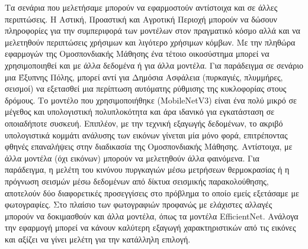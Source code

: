 Τα σενάρια που μελετήσαμε μπορούν να εφαρμοστούν αντίστοιχα και σε άλλες περιπτώσεις. Η Αστική, Προαστική και Αγροτική Περιοχή μπορούν να δώσουν πληροφορίες για την συμπεριφορά των μοντέλων στον πραγματικό κόσμο αλλά και να μελετηθούν περιπτώσεις χρήσιμων και λιγότερο χρήσιμων κόμβων. Με την πληθώρα εφαρμογών της Ομοσπονδιακής Μάθησης ένα τέτοιο οικοσύστημα μπορεί να χρησιμοποιηθεί και με άλλα δεδομένα ή για άλλα μοντέλα. Για παράδειγμα σε σενάριο μια Έξυπνης Πόλης, μπορεί αντί για Δημόσια Ασφάλεια (πυρκαγιές, πλυμμήρες, σεισμοί) να εξετασθεί μια περίπτωση αυτόματης ρύθμισης της κυκλοφορίας στους δρόμους. Το μοντέλο που χρησιμοποιήθηκε (MobileNetV3) είναι ένα πολύ μικρό σε μέγεθος και υπολογιστική πολυπλοκότητα και άρα ιδανικό για εγκατάσταση σε οποιαδήποτε συσκευή. Επιπλέον, με την τεχνική εξαγωγής δεδομένων, το ακριβό υπολογιστικά κομμάτι ανάλυσης των εικόνων γίνεται μία μόνο φορά, επιτρέποντας φθηνές επαναλήψεις στην διαδικασία της Ομοσπονδιακής Μάθησης. Αντίστοιχα, με άλλα μοντέλα (όχι εικόνων) μπορούν να μελετηθούν άλλα φαινόμενα. Για παράδειγμα, η μελέτη του κινύνου πυργκαγιών μέσω μετρήσεων θερμοκρασίας ή η πρόγνωση σεισμών μέσω δεδομένων από δίκτυα σεισμικής παρακολούθησης, αποτελούν δύο διαφορετικές προσεγγίσεις στο πρόβλημα το οποίο εμείς εξετάσαμε με φωτογραφίες. Στο πλαίσιο των φωτογραφιών προφανώς με ελάχιστες αλλαγές μπορούν να δοκιμασθούν και άλλα μοντέλα, όπως τα μοντέλα EfficientNet. Ανάλογα την εφαρμογή μπορεί να κάνουν καλύτερη εξαγωγή χαρακτηριστικών από τις εικόνες και αξίζει να γίνει μελέτη για την κατάλληλη επιλογή.